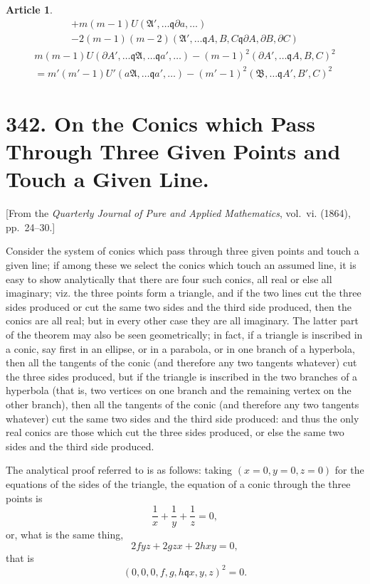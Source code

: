 \documentclass[11pt,a4paper]{article}
\theoremstyle{definition}
\newtheorem{art}{Article}[section]
\newcommand{\fA}{\mathfrak{A}}
\newcommand{\fB}{\mathfrak{B}}
\newcommand{\fApr}{\mathfrak{A}'}
\begin{document}
\begin{art}
\begin{multline*}
+ m(m-1)U(\fApr, \dots \mathbin{\mathfrak{q}} \partial a, \dots) \\
- 2(m-1)(m-2)(\fApr, \dots \mathbin{\mathfrak{q}} A, B, C \mathbin{\mathfrak{q}} \partial A, \partial B, \partial C)
\end{multline*}
\begin{multline*}
m(m-1)U(\partial A', \dots \mathbin{\mathfrak{q}} \fA, \dots \mathbin{\mathfrak{q}} a', \dots)
- (m-1)^2(\partial A', \dots \mathbin{\mathfrak{q}} A, B, C)^2 \\
= m'(m'-1)U'(a\fA, \dots \mathbin{\mathfrak{q}} a', \dots)
- (m'-1)^2(\fB, \dots \mathbin{\mathfrak{q}} A', B', C)^2
\end{multline*}
\end{art}

\newpage
\section{342. On the Conics which Pass Through Three Given Points and Touch a Given Line.}

[From the \textit{Quarterly Journal of Pure and Applied Mathematics}, vol.\ vi. (1864),
pp.~24--30.]

Consider the system of conics which pass through three given points and touch
a given line; if among these we select the conics which touch an assumed line, it is
easy to show analytically that there are four such conics, all real or else all imaginary;
viz. the three points form a triangle, and if the two lines cut the three sides produced
or cut the same two sides and the third side produced, then the conics are all real;
but in every other case they are all imaginary. The latter part of the theorem may
also be seen geometrically; in fact, if a triangle is inscribed in a conic, say first in
an ellipse, or in a parabola, or in one branch of a hyperbola, then all the tangents
of the conic (and therefore any two tangents whatever) cut the three sides produced,
but if the triangle is inscribed in the two branches of a hyperbola (that is, two
vertices on one branch and the remaining vertex on the other branch), then all the
tangents of the conic (and therefore any two tangents whatever) cut the same two
sides and the third side produced: and thus the only real conics are those which cut
the three sides produced, or else the same two sides and the third side produced.

The analytical proof referred to is as follows: taking $(x = 0, y = 0, z = 0)$ for the
equations of the sides of the triangle, the equation of a conic through the three points is
\[
\frac{1}{x} + \frac{1}{y} + \frac{1}{z} = 0,
\]
or, what is the same thing,
\[
2fyz + 2gzx + 2hxy = 0,
\]
that is
\[
(0, 0, 0, f, g, h \mathbin{\mathfrak{q}} x, y, z)^2 = 0.
\]
\end{document}
